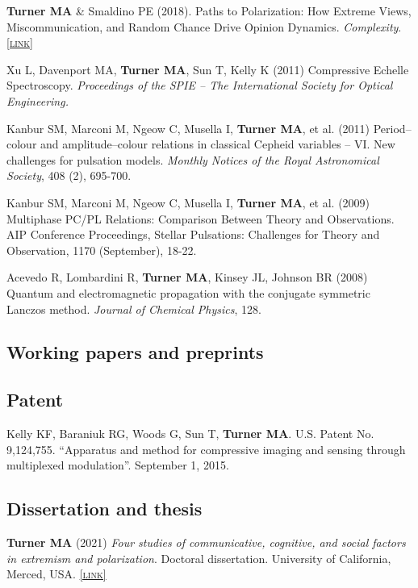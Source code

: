 \documentclass[11pt, letterpaper]{article}
\newcommand{\lurl}[1]{\href{#1}{\scriptsize\textsc{[link]}}}
\begin{document}
    \textbf{Turner MA} \& Smaldino PE (2018). Paths to Polarization: How Extreme Views,
    Miscommunication, and Random Chance Drive Opinion Dynamics. \emph{Complexity}. \lurl{https://doi.org/10.1155/2018/2740959}
    

    Xu L, Davenport MA, \textbf{Turner MA}, Sun T, Kelly K (2011) Compressive Echelle Spectroscopy. \emph{Proceedings of the SPIE – The International Society for Optical Engineering.}

    Kanbur SM, Marconi M, Ngeow C, Musella I, \textbf{Turner MA}, et al. (2011) Period–colour and amplitude–colour relations in classical Cepheid variables – VI. New challenges for pulsation models. \emph{Monthly Notices of the Royal Astronomical Society}, 408 (2), 695-700.

    Kanbur SM, Marconi M, Ngeow C, Musella I, \textbf{Turner MA}, et al. (2009) Multiphase PC/PL Relations: Comparison Between Theory and Observations. AIP Conference Proceedings, Stellar Pulsations: Challenges for Theory and Observation, 1170 (September), 18-22.

    Acevedo R, Lombardini R, \textbf{Turner MA}, Kinsey JL, Johnson BR (2008)
    Quantum and electromagnetic propagation with the conjugate symmetric
    Lanczos method. \emph{Journal of Chemical Physics}, 128.

    \subsection{Working papers and preprints}



    \subsection{Patent}

  Kelly KF, Baraniuk RG, Woods G, Sun T, \textbf{Turner MA}. U.S. Patent No. 9,124,755. 
  ``Apparatus and method for compressive imaging and sensing through multiplexed modulation''.
  September 1, 2015.

  \subsection{Dissertation and thesis}

  \textbf{Turner MA} (2021) \emph{Four studies of communicative, cognitive,
  and social factors in extremism and polarization}. Doctoral dissertation.
  University of California, Merced, USA. \lurl{https://escholarship.org/uc/item/56h2v4bg}
\end{document}
